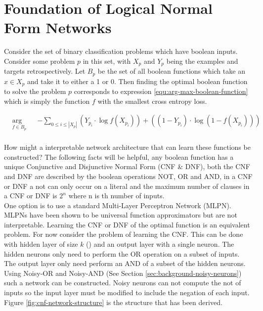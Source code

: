 \chapter{Foundation of Logical Normal Form Networks}\label{C:foundation-of-lnfns}
Consider the set of binary classification problems which have boolean inputs. Consider some problem $p$ in this set, with $X_p$ and $Y_p$ being the examples and targets retrospectively. Let $B_p$ be the set of all boolean functions which take an $x \in X_p$ and take it to either a 1 or 0. Then finding the optimal boolean function to solve the problem $p$ corresponds to expression \ref{equ:arg-max-boolean-function} which is simply the function $f$ with the smallest cross entropy loss.

\begin{equation}
\label{equ:arg-max-boolean-function}
\begin{aligned}
& \underset{f \in B_p}{\text{arg min}}
& & -\sum_{0 \leq i \leq |X_p|} (Y_{p_i} \cdot \log f(X_{p_i})) + ((1 - Y_{p_i}) \cdot \log(1 - f(X_{p_i})))  \\
\end{aligned}
\end{equation}

How might a interpretable network architecture that can learn these functions be constructed? The following facts will be helpful, any boolean function has a unique Conjunctive and Disjunctive Normal Form (CNF \& DNF), both the CNF and DNF are described by the boolean operations NOT, OR and AND, in a CNF or DNF a not can only occur on a literal and the maximum number of clauses in a CNF or DNF is $2^n$ where n is th number of inputs.\\

One option is to use a standard Multi-Layer Perceptron Network (MLPN). MLPNs have been shown to be universal function approximators but are not interpretable. Learning the CNF or DNF of the optimal function is an equivalent problem. For now consider the problem of learning the CNF. This can be done with hidden layer of size $k$ () and an output layer with a single neuron. The hidden neurons only need to perform the OR operation on a subset of inputs. The output layer only need perform an AND of a subset of the hidden neurons.\\

Using Noisy-OR and Noisy-AND (See Section \ref{sec:background-noisy-neurons}) such a network can be constructed. Noisy neurons can not compute the not of inputs so the input layer must be modified to include the negation of each input. Figure \ref{fig:cnf-network-structure} is the structure that has been derived.

